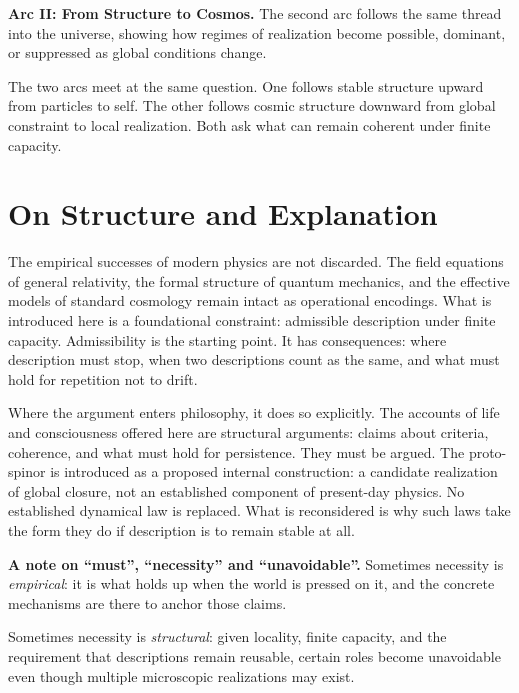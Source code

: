 \documentclass[11pt,twoside,openright]{book}
\begin{document}
\medskip

\textbf{Arc II: From Structure to Cosmos.}
The second arc follows the same thread into the universe,
showing how regimes of realization become possible,
dominant, or suppressed
as global conditions change.

\bigskip

The two arcs meet at the same question.
One follows stable structure upward from particles to self.
The other follows cosmic structure downward from global constraint to local realization.
Both ask what can remain coherent under finite capacity.

\cleardoublepage

\chapter*{On Structure and Explanation}

The empirical successes of modern physics are not discarded. The field equations of general relativity, the formal structure of quantum mechanics, and the effective models of standard cosmology remain intact as operational encodings. What is introduced here is a foundational constraint: admissible description under finite capacity. Admissibility is the starting point. It has consequences: where description must stop, when two descriptions count as the same, and what must hold for repetition not to drift.

Where the argument enters philosophy, it does so explicitly. The accounts of life and consciousness offered here are structural arguments: claims about criteria, coherence, and what must hold for persistence. They must be argued. The proto-spinor is introduced as a proposed internal construction: a candidate realization of global closure, not an established component of present-day physics. No established dynamical law is replaced. What is reconsidered is why such laws take the form they do if description is to remain stable at all.

\medskip
\noindent\textbf{A note on ``must'', ``necessity'' and ``unavoidable''.}
Sometimes necessity is \emph{empirical}:
it is what holds up when the world is pressed on it,
and the concrete mechanisms are there to anchor those claims.

Sometimes necessity is \emph{structural}: given locality, finite capacity, and the requirement that descriptions remain reusable, certain roles become unavoidable even though multiple microscopic realizations may exist.
\end{document}
